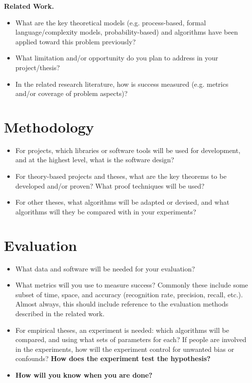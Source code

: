 \documentclass[11pt]{artikel3}
\begin{document}
{\bf Related Work.}
\begin{itemize}
  \item What are the key theoretical models (e.g. process-based, formal language/complexity models, probability-based) and algorithms have been applied toward this problem previously? 
  \item What limitation and/or opportunity do you plan to address in your project/thesis?
  \item
In the related research literature, how is success measured (e.g. metrics and/or coverage of problem aspects)?
\end{itemize}


\section{Methodology}


\begin{itemize}
\item For projects, which libraries or software tools will be used for development, and at the highest level, what is the software design?
\item For theory-based projects and theses, what are the key theorems to be developed and/or proven? What proof techniques will be used?
\item For other theses, what algorithms will be adapted or devised, and what algorithms will they be compared with in your experiments?
\end{itemize}


\section{Evaluation}


\begin{itemize}
\item What data and software will be needed for your evaluation? 
\item What metrics
will you use to measure success? Commonly these include some subset of time, space, and accuracy (recognition rate, precision, recall, etc.).
Almost always, this should include reference to the evaluation methods described in the related work.
\item For empirical theses, an experiment is needed: which algorithms will be compared, and using what sets of parameters for each? If people are involved in the experiments, how will the experiment control for unwanted bias or confounds? {\bf How does the experiment test the hypothesis?}
\item {\bf How will you know when you are done?}
\end{itemize}
\end{document}
